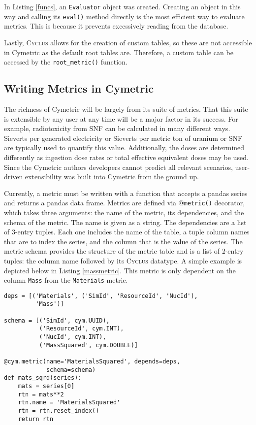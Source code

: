 \documentclass{anstrans}
\newcommand{\cyclus}{\textsc{Cyclus}\xspace}
\newcommand{\code}[1]{{\color{code}\texttt{#1}}}
\begin{document}
In Listing \ref{funcs}, an \code{Evaluator} object was created. 
Creating an object in this way and calling its \code{eval()} method directly 
is the most efficient way to evaluate metrics. This is because
it prevents excessively reading from the database.

Lastly, \cyclus allows for the creation of custom tables, so these are not accessible in Cymetric as the default root tables are. Therefore, a custom table can be accessed by the \code{root\_metric()} function.

\subsection{Writing Metrics in Cymetric}
The richness of Cymetric will be largely from its suite of metrics. 
That this suite is extensible by any user at any time will be a major 
factor in its success. For example, radiotoxicity from \gls{SNF} can 
be calculated in many different ways. Sieverts per generated electricity 
or Sieverts per metric ton of uranium or \gls{SNF} are typically used to 
quantify this value. Additionally, the doses are determined differently as 
ingestion dose rates or total effective equivalent doses may be used. 
Since the Cymetric authors developers cannot predict all relevant scenarios, 
user-driven extensibility was built into Cymetric from the ground up. 

Currently, a metric must be written with a function that accepts a pandas 
series and returns a pandas data frame. Metrics are defined via 
\code{$@$metric()} decorator, which takes three arguments: the name of the 
metric, its dependencies, and the schema of the metric. 
The name is given as a string. The dependencies are a list of 3-entry tuples. 
Each one includes the name of the table, a tuple column names that are to 
index the series, and the column that is the value of the series. 
The metric schema provides the structure of the metric table and is a 
list of 2-entry tuples: the column name followed by its \cyclus datatype. 
A simple example is depicted below in Listing \ref{massmetric}. This metric 
is only dependent on the column \code{Mass} from the \code{Materials} metric. 

\begin{lstlisting}[caption ={Writing a Metric in Cymetric}, label=massmetric]
deps = [('Materials', ('SimId', 'ResourceId', 'NucId'), 
         'Mass')]

schema = [('SimId', cym.UUID), 
          ('ResourceId', cym.INT),
          ('NucId', cym.INT),  
          ('MassSquared', cym.DOUBLE)]

@cym.metric(name='MaterialsSquared', depends=deps, 
            schema=schema)
def mats_sqrd(series):
    mats = series[0]
    rtn = mats**2
    rtn.name = 'MaterialsSquared'
    rtn = rtn.reset_index()
    return rtn
\end{lstlisting}
\end{document}

